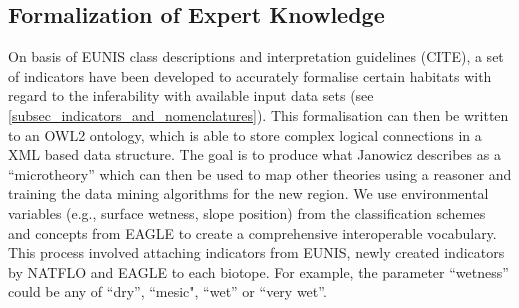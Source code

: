 \documentclass[authoryear, review,12pt,number]{elsarticle}
\begin{document}
\subsection{Formalization of Expert Knowledge}
On basis of EUNIS class descriptions and interpretation guidelines (CITE), a set
of indicators have been developed to accurately formalise certain
habitats with regard to the inferability with available input data sets (see
\ref{subsec_indicators_and_nomenclatures}). This formalisation can then be
written to an OWL2 ontology, which is able to store complex logical connections
in a XML based data structure.
The goal is to produce what Janowicz describes as a ``microtheory''
\citep{Janowicz2012} which can then be used to map other theories using a
reasoner and training the data mining algorithms for the new region. We use
environmental variables (e.g., surface wetness, slope position) from the
classification schemes and concepts from EAGLE to create a comprehensive interoperable vocabulary. This process involved attaching indicators from EUNIS, newly created indicators by NATFLO
and EAGLE to each biotope. For example, the parameter ``wetness'' could be any
of ``dry'', ``mesic", ``wet'' or ``very wet''. 
\end{document}

